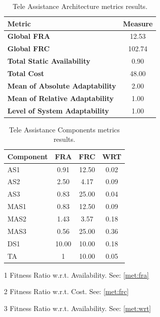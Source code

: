 \begin{table}[ht!b]
	\centering
	\begin{tabular}{|l|c|}
		\hline
		Metric & Measure \\
		\hline 
		\textbf{Global FRA} & 12.53 \\ 
		\hline 
		\textbf{Global FRC} & 102.74 \\
		\hline 
		\textbf{Total Static Availability} & 0.90 \\
		\hline 
		\textbf{Total Cost} & 48.00 \\
		\hline 
		\textbf{Mean of Absolute Adaptability} & 2.00 \\
		\hline
		\textbf{Mean of Relative Adaptability} & 1.00 \\
		\hline
		\textbf{Level of System Adaptability} & 1.00 \\
		\hline
	\end{tabular} 
	\caption[TAS Service Architecture Metrics]{Tele Assistance Architecture metrics results.}
	\label{tab:tas-arch-res}
\end{table}

\begin{table}[ht!b]
\centering
\begin{threeparttable}
	\begin{tabular}{|l|c|c|c|}
		\hline 
		\textbf{Component} & \textbf{FRA}\tnote{1} & \textbf{FRC}\tnote{2} & \textbf{WRT}\tnote{3} \\ 
		\hline 
		AS1 & 0.91 & 12.50 & 0.02 \\
		\hline 
		AS2 & 2.50 & 4.17 & 0.09 \\
		\hline 
		AS3 & 0.83 & 25.00 & 0.04 \\
		\hline 
		MAS1 & 0.83 & 12.50 & 0.09 \\
		\hline
		MAS2 & 1.43 & 3.57 & 0.18 \\
		\hline
		MAS3 & 0.56 & 25.00 & 0.36 \\
		\hline
		DS1 & 10.00 & 10.00 & 0.18 \\
		\hline
		TA & 1 & 10.00 & 0.05 \\
		\hline
	\end{tabular}
	\begin{tablenotes}\footnotesize
		\item[1] Fitness Ratio w.r.t. Availability. See: \ref{met:fra}
		\item[2] Fitness Ratio w.r.t. Cost. See: \ref{met:frc}
		\item[3] Fitness Ratio w.r.t. Availability. See: \ref{met:wrt}
	\end{tablenotes}
\end{threeparttable}
\caption[TAS Service Components Metrics]{Tele Assistance Components metrics results.}
\label{tab:tas-comp-res}
\end{table}

